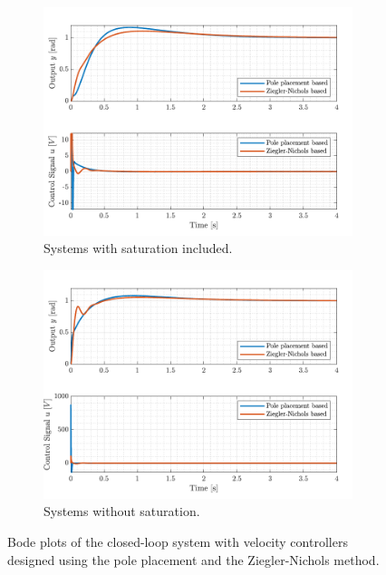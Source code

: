 \documentclass[../../main.tex]{subfiles}
\begin{document}
\begin{figure}[h]
\begin{subfigure}{0.49\textwidth}
    \includegraphics[width=0.99\textwidth]{Sections/System_Design/Images/CascadeWithSaturation.pdf}
    \caption{Systems with saturation included.}
    \label{fig:cascade_step_PP}
\end{subfigure}\hfill
\begin{subfigure}{0.49\textwidth}
    \includegraphics[width=0.99\textwidth]{Sections/System_Design/Images/CascadeWithoutSaturation.pdf}
    \caption{Systems without saturation.}
    \label{fig:cascade_step_NZ}
\end{subfigure}
\caption{Bode plots of the closed-loop system with velocity controllers designed using the pole placement and the Ziegler-Nichols method.}
\label{fig:cascade_step}
\end{figure}
\end{document}
